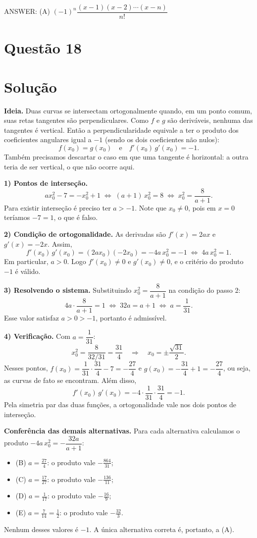 \documentclass{article}%
\begin{document}
ANSWER: (A) $(-1)^n\dfrac{(x-1)(x-2)\cdots(x-n)}{n!}$%
\newpage%
\section*{Questão 18}

\section*{Solução}

\textbf{Ideia.} Duas curvas se intersectam ortogonalmente quando, em um ponto comum, suas retas tangentes são perpendiculares. Como $f$ e $g$ são deriváveis, nenhuma das tangentes é vertical. Então a perpendicularidade equivale a ter o produto dos coeficientes angulares igual a $-1$ (sendo os dois coeficientes não nulos):
\[
f(x_0)=g(x_0) \quad\text{e}\quad f'(x_0)\,g'(x_0)=-1 .
\]
Também precisamos descartar o caso em que uma tangente é horizontal: a outra teria de ser vertical, o que não ocorre aqui.

\textbf{1) Pontos de interseção.}
\[
ax_0^2-7=-x_0^2+1 \;\Longleftrightarrow\; (a+1)\,x_0^2=8 \;\Longleftrightarrow\; x_0^2=\frac{8}{a+1}.
\]
Para existir interseção é preciso ter $a>-1$. Note que $x_0\neq 0$, pois em $x=0$ teríamos $-7=1$, o que é falso.

\textbf{2) Condição de ortogonalidade.} As derivadas são $f'(x)=2ax$ e $g'(x)=-2x$. Assim,
\[
f'(x_0)\,g'(x_0)=(2ax_0)(-2x_0)=-4a\,x_0^2=-1 \;\Longleftrightarrow\; 4a\,x_0^2=1 .
\]
Em particular, $a>0$. Logo $f'(x_0)\neq 0$ e $g'(x_0)\neq 0$, e o critério do produto $-1$ é válido.

\textbf{3) Resolvendo o sistema.} Substituindo $x_0^2=\dfrac{8}{a+1}$ na condição do passo 2:
\[
4a\cdot\frac{8}{a+1}=1 \;\Longleftrightarrow\; 32a=a+1 \;\Longleftrightarrow\; a=\frac{1}{31}.
\]
Esse valor satisfaz $a>0>-1$, portanto é admissível.

\textbf{4) Verificação.} Com $a=\dfrac{1}{31}$:
\[
x_0^2=\frac{8}{32/31}=\frac{31}{4} \quad\Longrightarrow\quad x_0=\pm\frac{\sqrt{31}}{2}.
\]
Nesses pontos, $f(x_0)=\dfrac{1}{31}\cdot\dfrac{31}{4}-7=-\dfrac{27}{4}$ e $g(x_0)=-\dfrac{31}{4}+1=-\dfrac{27}{4}$, ou seja, as curvas de fato se encontram. Além disso,
\[
f'(x_0)\,g'(x_0)=-4\cdot\frac{1}{31}\cdot\frac{31}{4}=-1 .
\]
Pela simetria par das duas funções, a ortogonalidade vale nos dois pontos de interseção.

\textbf{Conferência das demais alternativas.} Para cada alternativa calculamos o produto $-4a\,x_0^2=-\dfrac{32a}{a+1}$:
\begin{itemize}
\item (B) $a=\frac{27}{4}$: o produto vale $-\frac{864}{31}$;
\item (C) $a=\frac{17}{27}$: o produto vale $-\frac{136}{11}$;
\item (D) $a=\frac{1}{17}$: o produto vale $-\frac{16}{9}$;
\item (E) $a=\frac{7}{14}=\frac{1}{2}$: o produto vale $-\frac{32}{3}$.
\end{itemize}
Nenhum desses valores é $-1$. A única alternativa correta é, portanto, a (A).
\end{document}
